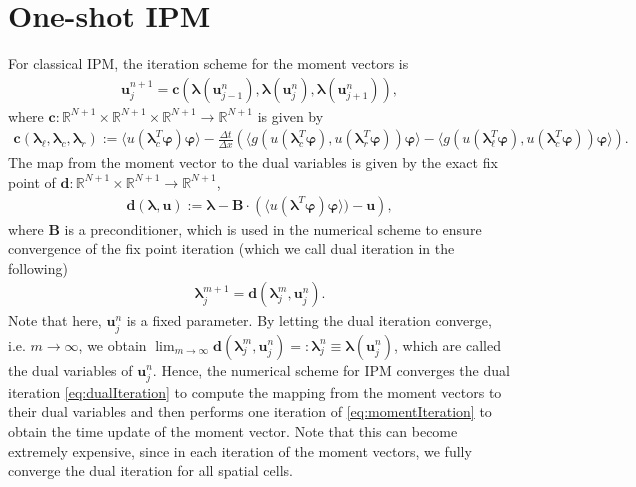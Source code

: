 \section{One-shot IPM}
\label{sec:OneShotIPM}
For classical IPM, the iteration scheme for the moment vectors is
\begin{align}\label{eq:momentIteration}
\bm{u}_j^{n+1} = \bm{c}\left(\bm{\lambda}(\bm{u}_{j-1}^n),\bm{\lambda}(\bm{u}_{j}^n),\bm{\lambda}(\bm{u}_{j+1}^n)\right),
\end{align}
where $\bm{c}:\mathbb{R}^{N+1}\times\mathbb{R}^{N+1}\times\mathbb{R}^{N+1}\to\mathbb{R}^{N+1}$ is given by
\begin{align*}
\bm{c}\left(\bm{\lambda}_{\ell},\bm{\lambda}_c,\bm{\lambda}_r\right):= \langle u(\bm{\lambda}_c^T\bm{\varphi})\bm{\varphi}\rangle - \frac{\Delta t}{\Delta x}\left(\langle g(u(\bm{\lambda}_c^T\bm{\varphi}),u(\bm{\lambda}_r^T\bm{\varphi}))\bm{\varphi}\rangle-\langle g(u(\bm{\lambda}_{\ell}^T\bm{\varphi}),u(\bm{\lambda}_c^T\bm{\varphi}))\bm{\varphi}\rangle\right).
\end{align*}
The map from the moment vector to the dual variables is given by the exact fix point of $\bm{d}:\mathbb{R}^{N+1}\times\mathbb{R}^{N+1}\to\mathbb{R}^{N+1}$,
\begin{align*}
\bm{d}(\bm{\lambda},\bm{u}):= \bm{\lambda}-\bm{B}\cdot \left(\langle u(\bm{\lambda}^T\bm{\varphi})\bm{\varphi}\rangle)-\bm{u}\right),
\end{align*}
where $\bm{B}$ is a preconditioner, which is used in the numerical scheme to ensure convergence of the fix point iteration (which we call dual iteration in the following)
\begin{align}\label{eq:dualIteration}
\bm{\lambda}_j^{m+1} = \bm{d}(\bm{\lambda}_j^m,\bm{u}_j^{n}).
\end{align}
Note that here, $\bm{u}_j^{n}$ is a fixed parameter. By letting the dual iteration converge, i.e. $m\rightarrow\infty$, we obtain $\lim_{m\rightarrow\infty}\bm{d}(\bm{\lambda}_j^m,\bm{u}_j^{n}) =:\bm{\lambda}_j^{n} \equiv \bm\lambda(\bm{u}_j^{n})$, which are called the dual variables of $\bm{u}_j^{n}$. Hence, the numerical scheme for IPM converges the dual iteration \eqref{eq:dualIteration} to compute the mapping from the moment vectors to their dual variables and then performs one iteration of \eqref{eq:momentIteration} to obtain the time update of the moment vector. Note that this can become extremely expensive, since in each iteration of the moment vectors, we fully converge the dual iteration for all spatial cells.

